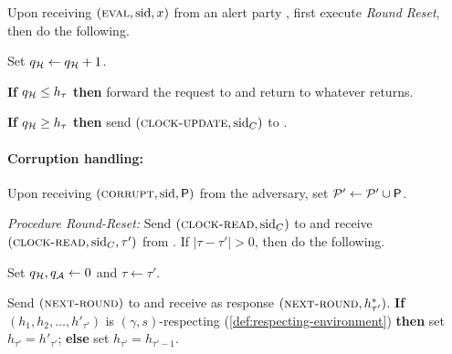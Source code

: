 \begin{cccFunctionality}
\begin{cccItemize}[nosep]
        \item Upon receiving $(\textsc{eval}, \mathrm{sid}, x)$ from an alert party \party, first execute \textit{Round Reset}, then do the following.
        \begin{cccEnum}[nosep]
            \item Set $q_\mathcal{H} \gets q_\mathcal{H} + 1$.
            \item \textbf{If} $q_\mathcal{H} \le h_\tau$ \textbf{then} forward the request to \funcRO and return to \party whatever \funcRO returns.
            \item \textbf{If} $q_\mathcal{H} \ge h_\tau$ \textbf{then} send $(\textsc{clock-update}, \mathrm{sid}_C)$ to \funcDriftingClock.
        \end{cccEnum}
    \end{cccItemize}

    \paragraph{Corruption handling:}
    \begin{cccItemize}[nosep]
        \item Upon receiving $(\textsc{corrupt}, \mathrm{sid}, \mathsf{P})$ from the adversary, set $\mathcal{P}' \gets \mathcal{P}' \cup \mathsf{P}$.
    \end{cccItemize}

    \medskip\emph{Procedure Round-Reset:}
    Send $(\textsc{clock-read}, \mathrm{sid}_C)$ to \funcDriftingClock and receive $(\textsc{clock-read}, \allowbreak \mathrm{sid}_C, \tau')$ from \funcDriftingClock. If $|\tau - \tau' | > 0$, then do the following.
    \begin{cccEnum}[nosep]
        \item Set $q_\mathcal{H}, q_\mathcal{A} \gets 0$ and $\tau \gets \tau'$.

        \item Send $(\textsc{next-round})$ to \adv and receive as response $(\textsc{next-round}, h^*_{\tau'})$.
        \textbf{If} $(h_1, h_2, \ldots, h'_{\tau'})$ is $(\gamma, s)$-respecting (\cref{def:respecting-environment}) \textbf{then} set $h_{\tau'} = h'_{\tau'}$; \textbf{else} set $h_{\tau'} = h_{\tau' - 1}$.
    \end{cccEnum}
\end{cccFunctionality}
